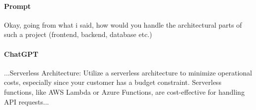 \documentclass[FM,DP]{tulthesis}
\begin{document}
				
				
				
				
				
				
				
			
		\begin{tcolorbox}[colback=white,colframe=black]
			\paragraph{Prompt} Okay, going from what i said, how would you handle the architectural parts of such a project (frontend, backend, database etc.)
			
			\vspace{0.6em}
			
			\paragraph{ChatGPT}
			...Serverless Architecture: Utilize a serverless architecture to minimize operational costs, especially since your customer has a budget constraint. Serverless functions, like AWS Lambda or Azure Functions, are cost-effective for handling API requests... \cite{chatgpt_analyza}
		\end{tcolorbox}
		\vspace{0.6em}
		
\end{document}

